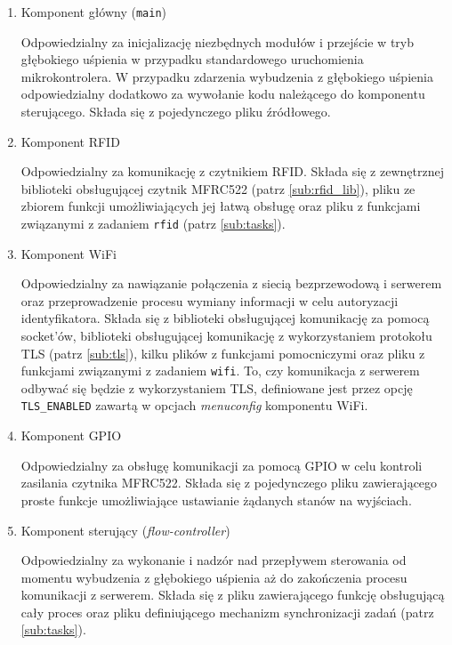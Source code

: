             \begin{enumerate}
                \item Komponent główny (\texttt{main})

                    Odpowiedzialny za inicjalizację niezbędnych modułów i przejście w tryb głębokiego uśpienia w przypadku standardowego uruchomienia mikrokontrolera. W przypadku zdarzenia wybudzenia z głębokiego uśpienia odpowiedzialny dodatkowo za wywołanie kodu należącego do komponentu sterującego. Składa się z pojedynczego pliku źródłowego.

                \item Komponent RFID

                    Odpowiedzialny za komunikację z czytnikiem RFID. Składa się z zewnętrznej biblioteki obsługującej czytnik MFRC522 (patrz \ref{sub:rfid_lib}), pliku ze zbiorem funkcji umożliwiających jej łatwą obsługę oraz pliku z funkcjami związanymi z zadaniem \texttt{rfid} (patrz \ref{sub:tasks}).

                \item Komponent WiFi

                    Odpowiedzialny za nawiązanie połączenia z siecią bezprzewodową i serwerem oraz przeprowadzenie procesu wymiany informacji w celu autoryzacji identyfikatora. Składa się z biblioteki obsługującej komunikację za pomocą socket'ów, biblioteki obsługującej komunikację z wykorzystaniem protokołu TLS (patrz \ref{sub:tls}), kilku plików z funkcjami pomocniczymi oraz pliku z funkcjami związanymi z zadaniem \texttt{wifi}. To, czy komunikacja z serwerem odbywać się będzie z wykorzystaniem TLS, definiowane jest przez opcję \texttt{TLS\_ENABLED} zawartą w opcjach \textit{menuconfig} komponentu WiFi.

                \item Komponent GPIO

                    Odpowiedzialny za obsługę komunikacji za pomocą GPIO w celu kontroli zasilania czytnika MFRC522. Składa się z pojedynczego pliku zawierającego proste funkcje umożliwiające ustawianie żądanych stanów na wyjściach.

                \item Komponent sterujący (\textit{flow-controller})

                    Odpowiedzialny za wykonanie i nadzór nad przepływem sterowania od momentu wybudzenia z głębokiego uśpienia aż do zakończenia procesu komunikacji z serwerem. Składa się z pliku zawierającego funkcję obsługującą cały proces oraz pliku definiującego mechanizm synchronizacji zadań (patrz \ref{sub:tasks}).

            \end{enumerate}

